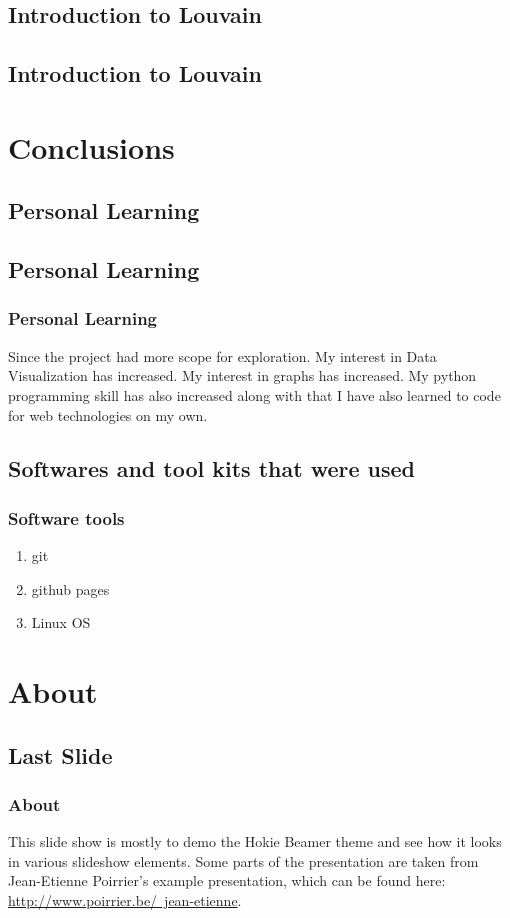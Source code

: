 \documentclass{beamer}
\begin{document}
\subsection{Introduction to Louvain}

\frame
{
	
}
\subsection{Introduction to Louvain}



\section{Conclusions}
\subsection{Personal Learning}


\subsection{Personal Learning}

\frame
{
	\frametitle{Personal Learning}
Since the project had more scope for exploration.
My interest in Data Visualization has increased.
My interest in graphs has increased.
My python programming skill has also increased along with that I have also learned to code for web technologies on my own.
}

\subsection{Softwares and tool kits that were used}

\frame
{
	\frametitle{Software tools}
	\begin{enumerate}
		\item git
		\item github pages
		\item Linux OS
	\end{enumerate}
}


\section{About}
\subsection{Last Slide}

\frame
{
	\frametitle{About}

	This slide show is mostly to demo the Hokie Beamer theme and see how it looks in various slideshow elements.  Some parts of the presentation are taken from Jean-Etienne Poirrier's example presentation, which can be found here:  \href{http://www.poirrier.be/~jean-etienne}{http://www.poirrier.be/~jean-etienne}.
	
	

{}
}
\end{document}
